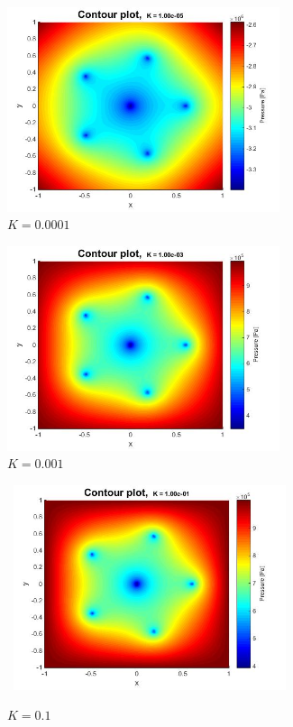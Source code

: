 \documentclass[a4paper]{report}
\begin{document}
\begin{figure}\label{Contourplots}
	\centering
	\begin{subfigure}{.45\textwidth}
		\centering
		\includegraphics[width=8cm]{K0_00001_contour.jpg}
		\caption{$K=0.0001$}
		\label{fig:sub1}
	\end{subfigure}%
	\begin{subfigure}{.45\textwidth}
		\centering
		\includegraphics[width=8cm]{K0_001_contour.jpg}
		\caption{$K=0.001$}
		\label{fig:sub2}
	\end{subfigure}
	\begin{subfigure}{.45\textwidth}
	\centering\
	\includegraphics[width=8cm]{K0_1_contour.jpg}
	\caption{$K=0.1$}
	\label{fig:sub3}
	\end{subfigure}%
	\begin{subfigure}{.45\textwidth}

\end{subfigure}
\end{figure}
\end{document}
